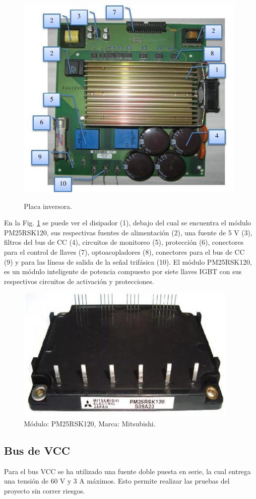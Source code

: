 \documentclass[conference]{IEEEtran}
\begin{document}
\begin{figure}[!t]
\centering
\includegraphics[width=8 cm]{figuras/figura_10.jpeg} \\
\caption{Placa inversora.} 
\label{fig_placaI}
\end{figure}

En la Fig. \ref{fig_placaI} se puede ver el disipador (1), debajo del cual se encuentra el módulo PM25RSK120, sus respectivas fuentes de alimentación (2), una fuente de 5 V (3), filtros del bus de CC (4), circuitos de monitoreo (5), protección (6), conectores para el control de llaves (7), optoacopladores (8), conectores para el bus de CC (9) y para las líneas de salida de la señal trifásica (10). El módulo PM25RSK120, es un módulo inteligente de potencia compuesto por siete llaves IGBT con sus respectivos circuitos de activación y protecciones. 

\begin{figure}[!t]
\centering
\includegraphics[width=8 cm]{figuras/figura_11.jpeg} 
\caption{Módulo: PM25RSK120, Marca: Mitsubishi.} 
\label{fig_PM25R}
\end{figure}

\subsection{Bus de VCC}

Para el bus  VCC se ha utilizado una fuente doble puesta en serie, la cual entrega una tensión de 60 V y 3 A máximos. Esto permite realizar las pruebas del proyecto sin correr riesgos.
\end{document}
